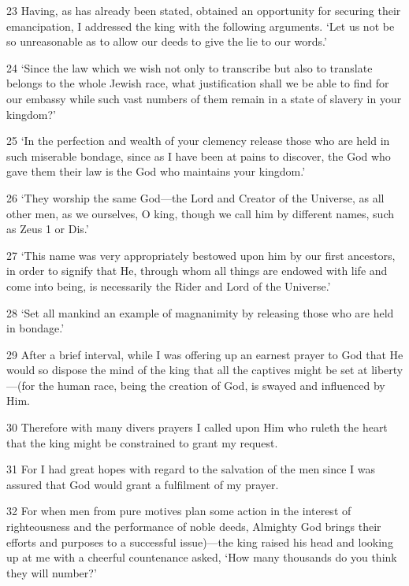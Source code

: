 \par 23 Having, as has already been stated, obtained an opportunity for securing their emancipation, I addressed the king with the following arguments. ‘Let us not be so unreasonable as to allow our deeds to give the lie to our words.’

\par 24 ‘Since the law which we wish not only to transcribe but also to translate belongs to the whole Jewish race, what justification shall we be able to find for our embassy while such vast numbers of them remain in a state of slavery in your kingdom?’

\par 25 ‘In the perfection and wealth of your clemency release those who are held in such miserable bondage, since as I have been at pains to discover, the God who gave them their law is the God who maintains your kingdom.’

\par 26 ‘They worship the same God—the Lord and Creator of the Universe, as all other men, as we ourselves, O king, though we call him by different names, such as Zeus 1 or Dis.’

\par 27 ‘This name was very appropriately bestowed upon him by our first ancestors, in order to signify that He, through whom all things are endowed with life and come into being, is necessarily the Rider and Lord of the Universe.’

\par 28 ‘Set all mankind an example of magnanimity by releasing those who are held in bondage.’

\par 29 After a brief interval, while I was offering up an earnest prayer to God that He would so dispose the mind of the king that all the captives might be set at liberty—(for the human race, being the creation of God, is swayed and influenced by Him.

\par 30 Therefore with many divers prayers I called upon Him who ruleth the heart that the king might be constrained to grant my request.

\par 31 For I had great hopes with regard to the salvation of the men since I was assured that God would grant a fulfilment of my prayer.

\par 32 For when men from pure motives plan some action in the interest of righteousness and the performance of noble deeds, Almighty God brings their efforts and purposes to a successful issue)—the king raised his head and looking up at me with a cheerful countenance asked, ‘How many thousands do you think they will number?’

